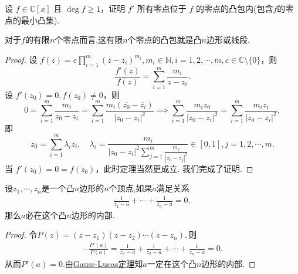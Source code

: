 \documentclass[../../main.tex]{subfiles}%
\begin{document}
\begin{theorem}\label{theorem:Gauss-Lucas定理}
设 \( f \in \mathbb{C}[x] \) 且 \( \deg f \geqslant 1 \)，证明 \( f' \) 所有零点位于 \( f \) 的零点的凸包内(包含$f$的零点的最小凸集).
\end{theorem}
\begin{remark}
对于$f$的有限$n$个零点而言,这有限$n$个零点的凸包就是凸$n$边形或线段.
\end{remark}
\begin{proof}
设 \( f(z) = c \prod_{i=1}^m (z - z_i)^{m_i}, m_i \in \mathbb{N}, i = 1,2,\cdots,m, c \in \mathbb{C} \setminus \{0\} \)，则
\[
\frac{f'(z)}{f(z)} = \sum_{i=1}^m \frac{m_i}{z - z_i}.
\]
设 \( f'(z_0) = 0, f(z_0) \neq 0 \)，则
\[
0 = \sum_{i=1}^m \frac{m_i}{z_0 - z_i} = \sum_{i=1}^m \frac{m_i (\overline{z_0} - \overline{z_i})}{|z_0 - z_i|^2} \implies \sum_{i=1}^m \frac{m_i z_0}{|z_0 - z_i|^2} = \sum_{i=1}^m \frac{m_i z_i}{|z_0 - z_i|^2},
\]
即
\[
z_0 = \sum_{i=1}^m \lambda_i z_i, \quad \lambda_i = \frac{m_i}{|z_0 - z_i|^2 \sum\limits_{j=1}^m \frac{m_j}{|z_0 - z_j|^2}} \in [0,1], j = 1,2,\cdots,m.
\]
当 \( f'(z_0) = 0 = f(z_0) \)，此时定理当然更成立. 我们完成了证明.
\end{proof}

\begin{corollary}
设$z_1,\cdots,z_n$是一个凸$n$边形的$n$个顶点,如果$a$满足关系
\begin{align*}
\frac{1}{z_1-a}+\cdots+\frac{1}{z_n-a}=0,
\end{align*}
那么$a$必在这个凸$n$边形的内部.
\end{corollary}
\begin{proof}
令$P\left( z \right) =\left( z-z_1 \right) \left( z-z_2 \right) \cdots \left( z-z_n \right),$则
\begin{align*}
-\frac{P'\left( a \right)}{P\left( a \right)}=\frac{1}{z_1-a}+\frac{1}{z_2-a}+\cdots +\frac{1}{z_n-a}=0.
\end{align*}
从而$P'\left( a \right) =0.$由\hyperref[theorem:Gauss-Lucas定理]{Gauss-Lucas定理}知$a$一定在这个凸$n$边形的内部.
\end{proof}
\end{document}
